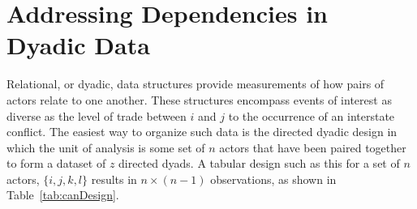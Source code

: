 \section{\textbf{Addressing Dependencies in Dyadic Data}}

Relational, or dyadic, data structures provide measurements of how pairs of actors relate to one another. These structures encompass events of interest as diverse as the level of trade between $i$ and $j$ to the occurrence of an interstate conflict. The easiest way to organize such data is the directed dyadic design in which the unit of analysis is some set of $n$ actors that have been paired together to form a dataset of $z$ directed dyads. A tabular design such as this for a set of $n$ actors, $\{i, j, k, l \}$ results in $n \times (n-1)$ observations, as shown in Table~\ref{tab:canDesign}. 


